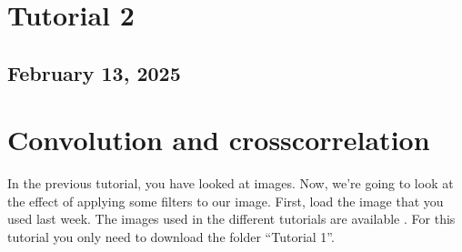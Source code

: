 \documentclass[letterpaper,10pt,english]{jupyterBook}
\begin{document}
\sphinxAtStartPar


\sphinxstepscope


\chapter{Tutorial 2}
\label{\detokenize{notebooks/Tutorial2_ConvolutionalNeuralNetworks/Tutorial2_ConvolutionalNeuralNetworks_student:tutorial-2}}\label{\detokenize{notebooks/Tutorial2_ConvolutionalNeuralNetworks/Tutorial2_ConvolutionalNeuralNetworks_student::doc}}

\section{February 13, 2025}
\label{\detokenize{notebooks/Tutorial2_ConvolutionalNeuralNetworks/Tutorial2_ConvolutionalNeuralNetworks_student:february-13-2025}}

\chapter{Convolution and cross\sphinxhyphen{}correlation}
\label{\detokenize{notebooks/Tutorial2_ConvolutionalNeuralNetworks/Tutorial2_ConvolutionalNeuralNetworks_student:convolution-and-cross-correlation}}
\sphinxAtStartPar
In the previous tutorial, you have looked at images. Now, we’re going to look at the effect of applying some filters to our image. First, load the image that you used last week.
The images used in the different tutorials are available .
For this tutorial you only need to download the folder “Tutorial 1”.
\end{document}
